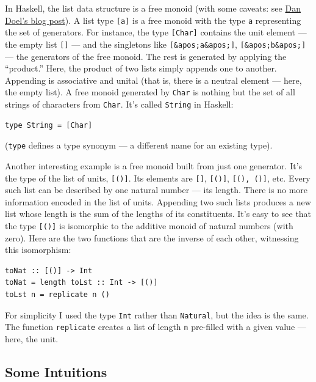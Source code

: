 In Haskell, the list data structure is a free monoid (with some caveats:
see \href{http://comonad.com/reader/2015/free-monoids-in-haskell/}{Dan
Doel's blog post}). A list type \texttt{{[}a{]}} is a free monoid with
the type \texttt{a} representing the set of generators. For instance,
the type \texttt{{[}Char{]}} contains the unit element --- the empty
list \texttt{{[}{]}} --- and the singletons like
\texttt{{[}\&apos;a\&apos;{]}}, \texttt{{[}\&apos;b\&apos;{]}} --- the
generators of the free monoid. The rest is generated by applying the
``product.'' Here, the product of two lists simply appends one to
another. Appending is associative and unital (that is, there is a
neutral element --- here, the empty list). A free monoid generated by
\texttt{Char} is nothing but the set of all strings of characters from
\texttt{Char}. It's called \texttt{String} in Haskell:

\begin{verbatim}
type String = [Char]
\end{verbatim}

(\texttt{type} defines a type synonym --- a different name for an
existing type).

Another interesting example is a free monoid built from just one
generator. It's the type of the list of units, \texttt{{[}(){]}}. Its
elements are \texttt{{[}{]}}, \texttt{{[}(){]}}, \texttt{{[}(),\ (){]}},
etc. Every such list can be described by one natural number --- its
length. There is no more information encoded in the list of units.
Appending two such lists produces a new list whose length is the sum of
the lengths of its constituents. It's easy to see that the type
\texttt{{[}(){]}} is isomorphic to the additive monoid of natural
numbers (with zero). Here are the two functions that are the inverse of
each other, witnessing this isomorphism:

\begin{verbatim}
toNat :: [()] -> Int
toNat = length toLst :: Int -> [()]
toLst n = replicate n ()
\end{verbatim}

For simplicity I used the type \texttt{Int} rather than
\texttt{Natural}, but the idea is the same. The function
\texttt{replicate} creates a list of length \texttt{n} pre-filled with a
given value --- here, the unit.

\subsection{Some Intuitions}\label{some-intuitions}

